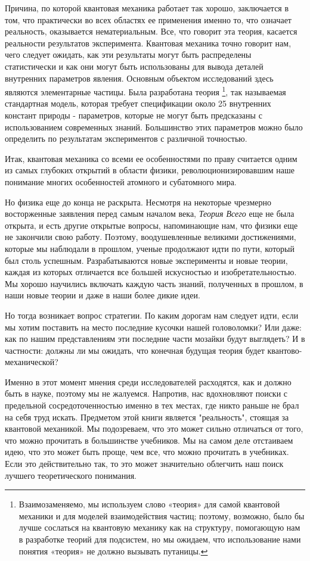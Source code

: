 \documentclass[main.tex]{subfiles}
\begin{document}
Причина, по которой квантовая механика работает так хорошо, заключается в том, что практически во всех областях ее применения именно то, что означает реальность, оказывается нематериальным. Все, что говорит эта теория, касается реальности результатов эксперимента. Квантовая механика точно говорит нам, чего следует ожидать, как эти результаты могут быть распределены статистически и как они могут быть использованы для вывода деталей внутренних параметров явления. Основным объектом исследований здесь являются элементарные частицы. Была разработана теория \footnote{Взаимозаменяемо, мы используем слово «теория» для самой квантовой механики и для моделей взаимодействия частиц; поэтому, возможно, было бы лучше сослаться на квантовую механику как на структуру, помогающую нам в разработке теорий для подсистем, но мы ожидаем, что использование нами понятия «теория» не должно вызывать путаницы.}, так называемая стандартная модель, которая требует спецификации около 25 внутренних констант природы - параметров, которые не могут быть предсказаны с использованием современных знаний. Большинство этих параметров можно было определить по результатам экспериментов с различной точностью. 

Итак, квантовая механика со всеми ее особенностями по праву считается одним из самых глубоких открытий в области физики, революционизировавшим наше понимание многих особенностей атомного и субатомного мира. 

Но физика еще до конца не раскрыта. Несмотря на некоторые чрезмерно восторженные заявления перед самым началом века, \textit{Теория Всего} еще не была открыта, и есть другие открытые вопросы, напоминающие нам, что физики еще не закончили свою работу. Поэтому, воодушевленные великими достижениями, которые мы наблюдали в прошлом, ученые продолжают идти по пути, который был столь успешным. Разрабатываются новые эксперименты и новые теории, каждая из которых отличается все большей искусностью и изобретательностью. Мы хорошо научились включать каждую часть знаний, полученных в прошлом, в наши новые теории и даже в наши более дикие идеи. 

Но тогда возникает вопрос стратегии. По каким дорогам нам следует идти, если мы хотим поставить на место последние кусочки нашей головоломки? Или даже: как по нашим представлениям эти последние части мозайки будут выглядеть? И в частности: должны ли мы ожидать, что конечная будущая теория будет квантово-механической? 

Именно в этот момент мнения среди исследователей расходятся, как и должно быть в науке, поэтому мы не жалуемся. Напротив, нас вдохновляют поиски с предельной сосредоточенностью именно в тех местах, где никто раньше не брал на себя труд искать. Предметом этой книги является "реальность", стоящая за квантовой механикой. Мы подозреваем, что это может сильно отличаться от того, что можно прочитать в большинстве учебников. Мы на самом деле отстаиваем идею, что это может быть проще, чем все, что можно прочитать в учебниках. Если это действительно так, то это может значительно облегчить наш поиск лучшего теоретического понимания. 
\end{document}
